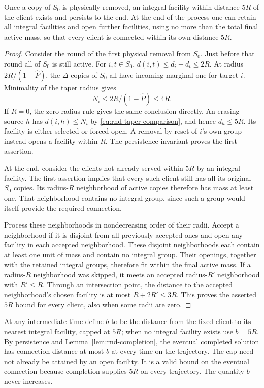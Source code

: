 \begin{lemma}\label{lem:rnd-completion}
Once a copy of $S_0$ is physically removed, an integral facility within
distance $5R$ of the client exists and persists to the end.
At the end of the process one can retain all integral facilities and
open further facilities, using no more than the total final active
mass, so that every client is connected within its own distance $5R$.
\end{lemma}

\begin{proof}
Consider the round of the first physical removal from $S_0$.  Just
before that round all of $S_0$ is still active.  For $i,t\in S_0$,
$d(i,t)\le d_i+d_t\le2R$.  At radius $2R/(1-\widehat P)$, the
$\Delta$ copies of $S_0$ all have incoming marginal one for target
$i$.  Minimality of the taper radius gives
\[
 N_i\le2R/(1-\widehat P)\le4R.
\]
If $R=0$, the zero-radius rule gives the same conclusion directly.
An erasing source $h$ has $d(i,h)\le N_i$ by
\eqref{eq:rnd-taper-comparison}, and hence $d_h\le5R$.
Its facility is either selected or forced open.  A removal by reset
of $i$'s own group instead opens a facility within $R$.
The persistence invariant proves the first assertion.

At the end, consider the clients not already served within $5R$ by
an integral facility.  The first assertion implies that every such
client still has all its original $S_0$ copies.  Its radius-$R$
neighborhood of active copies therefore has mass at least one.
That neighborhood contains no integral group, since such a group
would itself provide the required connection.

Process these neighborhoods in nondecreasing order of their radii.
Accept a neighborhood if it is disjoint from all previously accepted
ones and open any facility in each accepted neighborhood.  These
disjoint neighborhoods each contain at least one unit of mass and
contain no integral group.  Their openings, together with the retained
integral groups, therefore fit within the final active mass.
If a radius-$R$ neighborhood was skipped, it meets an accepted
radius-$R'$ neighborhood with $R'\le R$.  Through an intersection
point, the distance to the accepted neighborhood's chosen facility
is at most $R+2R'\le3R$.  This proves the asserted $5R$ bound for
every client, also when some radii are zero.
\end{proof}

At any intermediate time define $b$ to be the distance from the fixed
client to its nearest integral facility, capped at $5R$; when no
integral facility exists use $b=5R$.  By persistence and
Lemma~\ref{lem:rnd-completion}, the eventual completed solution has
connection distance at most $b$ at every time on the trajectory.
The cap need not already be attained by an open facility.  It is a
valid bound on the eventual connection because completion supplies
$5R$ on every trajectory.  The quantity $b$ never increases.

